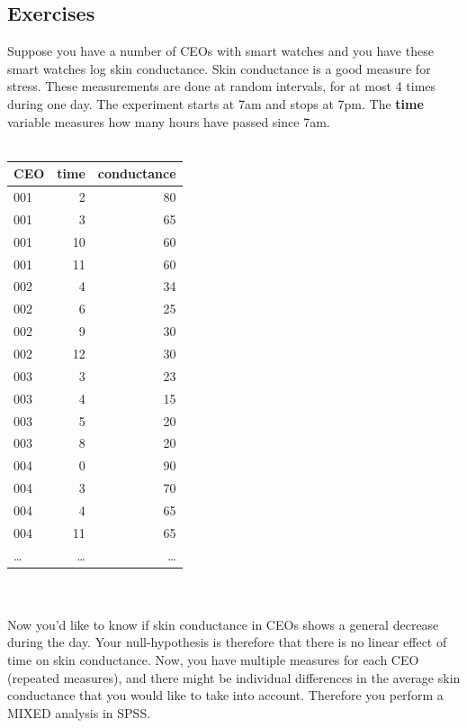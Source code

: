 \documentclass[]{book}\usepackage[]{graphicx}\usepackage[]{color}
\begin{document}
\subsection{Exercises}

Suppose you have a number of CEOs with smart watches and you have these smart watches log skin conductance. Skin conductance is a good measure for stress. These measurements are done at random intervals, for at most 4 times during one day. The experiment starts at 7am and stops at 7pm. The \textbf{time} variable measures how many hours have passed since 7am.
 \\
 \\
 \begin{tabular}{lrr}
 CEO & time & conductance \\ \hline
 001 & 2 & 80 \\
 001 & 3 & 65 \\
 001 & 10 & 60 \\
 001 & 11 & 60 \\
 002 & 4 & 34 \\
 002 & 6 & 25 \\
 002 & 9 & 30 \\
 002 & 12 & 30 \\
 003 & 3 & 23 \\
 003 & 4 & 15 \\
 003 & 5 & 20 \\
 003 & 8 & 20 \\
 004 & 0 & 90 \\
 004 & 3 & 70 \\
 004 & 4 & 65 \\
 004 & 11 & 65 \\
 \dots & \dots & \dots \\
 \end{tabular}
\\
\\
Now you'd like to know if skin conductance in CEOs shows a general decrease during the day. Your null-hypothesis is therefore that there is no linear effect of time on skin conductance. Now, you have multiple measures for each CEO (repeated measures), and there might be individual differences in the average skin conductance that you would like to take into account. Therefore you perform a MIXED analysis in SPSS. 
\end{document}
